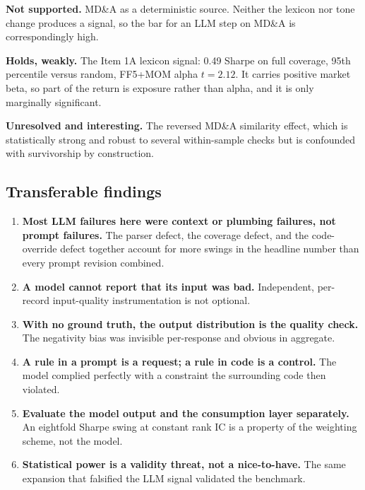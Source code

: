 \documentclass[11pt]{article}
\begin{document}
\textbf{Not supported.} MD\&A as a deterministic source. Neither the lexicon nor tone
change produces a signal, so the bar for an LLM step on MD\&A is correspondingly high.

\textbf{Holds, weakly.} The Item 1A lexicon signal: 0.49 Sharpe on full coverage, 95th
percentile versus random, FF5+MOM alpha $t = 2.12$. It carries positive market beta, so
part of the return is exposure rather than alpha, and it is only marginally significant.

\textbf{Unresolved and interesting.} The reversed MD\&A similarity effect, which is
statistically strong and robust to several within-sample checks but is confounded with
survivorship by construction.

\subsection{Transferable findings}

\begin{enumerate}[leftmargin=1.6em,itemsep=0.25em]
  \item \textbf{Most LLM failures here were context or plumbing failures, not prompt
        failures.} The parser defect, the coverage defect, and the code-override defect
        together account for more swings in the headline number than every prompt revision
        combined.
  \item \textbf{A model cannot report that its input was bad.} Independent, per-record
        input-quality instrumentation is not optional.
  \item \textbf{With no ground truth, the output distribution is the quality check.} The
        negativity bias was invisible per-response and obvious in aggregate.
  \item \textbf{A rule in a prompt is a request; a rule in code is a control.} The model
        complied perfectly with a constraint the surrounding code then violated.
  \item \textbf{Evaluate the model output and the consumption layer separately.} An
        eightfold Sharpe swing at constant rank IC is a property of the weighting scheme,
        not the model.
  \item \textbf{Statistical power is a validity threat, not a nice-to-have.} The same
        expansion that falsified the LLM signal validated the benchmark.
\end{enumerate}

\end{document}

